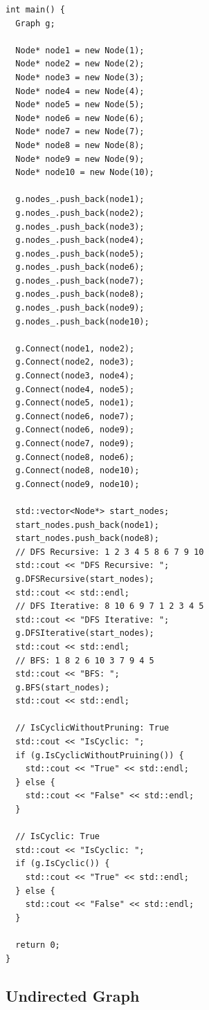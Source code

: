 \begin{lstlisting}
int main() {
  Graph g;

  Node* node1 = new Node(1);
  Node* node2 = new Node(2);
  Node* node3 = new Node(3);
  Node* node4 = new Node(4);
  Node* node5 = new Node(5);
  Node* node6 = new Node(6);
  Node* node7 = new Node(7);
  Node* node8 = new Node(8);
  Node* node9 = new Node(9);
  Node* node10 = new Node(10);

  g.nodes_.push_back(node1);
  g.nodes_.push_back(node2);
  g.nodes_.push_back(node3);
  g.nodes_.push_back(node4);
  g.nodes_.push_back(node5);
  g.nodes_.push_back(node6);
  g.nodes_.push_back(node7);
  g.nodes_.push_back(node8);
  g.nodes_.push_back(node9);
  g.nodes_.push_back(node10);

  g.Connect(node1, node2);
  g.Connect(node2, node3);
  g.Connect(node3, node4);
  g.Connect(node4, node5);
  g.Connect(node5, node1);
  g.Connect(node6, node7);
  g.Connect(node6, node9);
  g.Connect(node7, node9);
  g.Connect(node8, node6);
  g.Connect(node8, node10);
  g.Connect(node9, node10);

  std::vector<Node*> start_nodes;
  start_nodes.push_back(node1);
  start_nodes.push_back(node8);
  // DFS Recursive: 1 2 3 4 5 8 6 7 9 10
  std::cout << "DFS Recursive: ";
  g.DFSRecursive(start_nodes);
  std::cout << std::endl;
  // DFS Iterative: 8 10 6 9 7 1 2 3 4 5
  std::cout << "DFS Iterative: ";
  g.DFSIterative(start_nodes);
  std::cout << std::endl;
  // BFS: 1 8 2 6 10 3 7 9 4 5
  std::cout << "BFS: ";
  g.BFS(start_nodes);
  std::cout << std::endl;

  // IsCyclicWithoutPruning: True
  std::cout << "IsCyclic: ";
  if (g.IsCyclicWithoutPruining()) {
    std::cout << "True" << std::endl;
  } else {
    std::cout << "False" << std::endl;
  }

  // IsCyclic: True
  std::cout << "IsCyclic: ";
  if (g.IsCyclic()) {
    std::cout << "True" << std::endl;
  } else {
    std::cout << "False" << std::endl;
  }

  return 0;
}
\end{lstlisting}

\subsection{Undirected Graph}
